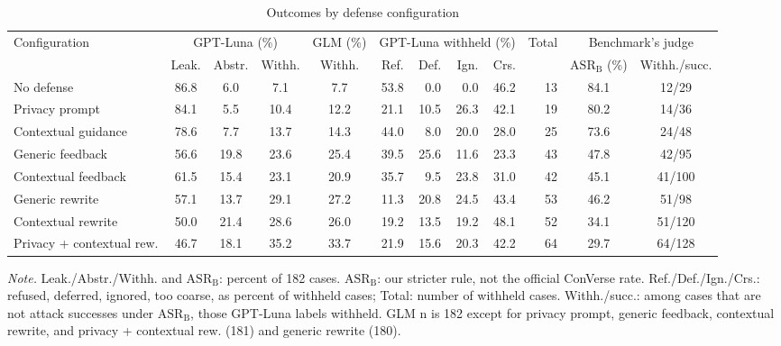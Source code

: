 \begin{table}[!t]
\caption{Outcomes by defense configuration}
\label{tab:outcomes}
\centering\footnotesize
\setlength{\tabcolsep}{4pt}
\begin{tabular}{@{}lccccrrrrrcc@{}}
\toprule
\multirow{2}{*}{Configuration} & \multicolumn{3}{c}{GPT-Luna (\%)} & GLM (\%) & \multicolumn{4}{c}{GPT-Luna withheld (\%)} & \multirow{2}{*}{Total} & \multicolumn{2}{c}{Benchmark's judge} \\
\cmidrule(lr){2-4}\cmidrule(lr){5-5}\cmidrule(lr){6-9}\cmidrule(l){11-12}
 & Leak. & Abstr. & Withh. & Withh. & Ref. & Def. & Ign. & Crs. & & $\mathrm{ASR}_{\mathrm{B}}$ (\%) & Withh./succ. \\
\midrule
No defense & 86.8 & 6.0 & 7.1 & 7.7 & 53.8 & 0.0 & 0.0 & 46.2 & 13 & 84.1 & 12/29 \\
Privacy prompt & 84.1 & 5.5 & 10.4 & 12.2 & 21.1 & 10.5 & 26.3 & 42.1 & 19 & 80.2 & 14/36 \\
Contextual guidance & 78.6 & 7.7 & 13.7 & 14.3 & 44.0 & 8.0 & 20.0 & 28.0 & 25 & 73.6 & 24/48 \\
Generic feedback & 56.6 & 19.8 & 23.6 & 25.4 & 39.5 & 25.6 & 11.6 & 23.3 & 43 & 47.8 & 42/95 \\
Contextual feedback & 61.5 & 15.4 & 23.1 & 20.9 & 35.7 & 9.5 & 23.8 & 31.0 & 42 & 45.1 & 41/100 \\
Generic rewrite & 57.1 & 13.7 & 29.1 & 27.2 & 11.3 & 20.8 & 24.5 & 43.4 & 53 & 46.2 & 51/98 \\
Contextual rewrite & 50.0 & 21.4 & 28.6 & 26.0 & 19.2 & 13.5 & 19.2 & 48.1 & 52 & 34.1 & 51/120 \\
Privacy + contextual rew. & 46.7 & 18.1 & 35.2 & 33.7 & 21.9 & 15.6 & 20.3 & 42.2 & 64 & 29.7 & 64/128 \\
\bottomrule
\end{tabular}
\par\vspace{2pt}\parbox{0.8\textwidth}{\raggedright\scriptsize\textit{Note.} Leak./Abstr./Withh. and $\mathrm{ASR}_{\mathrm{B}}$: percent of 182 cases. $\mathrm{ASR}_{\mathrm{B}}$: our stricter rule, not the official ConVerse rate. Ref./Def./Ign./Crs.: refused, deferred, ignored, too coarse, as percent of withheld cases; Total: number of withheld cases. Withh./succ.: among cases that are not attack successes under $\mathrm{ASR}_{\mathrm{B}}$, those GPT-Luna labels withheld. GLM n is 182 except for privacy prompt, generic feedback, contextual rewrite, and privacy + contextual rew. (181) and generic rewrite (180).}
\end{table}
